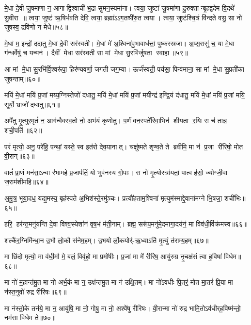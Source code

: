 मे॒धा दे॒वी जु॒षमा॑णा न॒ आगाद्वि॒श्वाची॑ भ॒द्रा सु॑मन॒स्यमा॑ना। त्वया॒ जुष्टा॑ जु॒षमा॑णा दु॒रुक्तान्बृ॒हद्व॑देम वि॒दथे॑ सु॒वीरा॥ त्वया॒ जुष्ट॑ ऋ॒षिर्भ॑वति देवि॒ त्वया॒ ब्रह्मा॑ऽऽग॒तश्री॑रु॒त त्वया। त्वया॒ जुष्ट॑श्चि॒त्रं वि॑न्दते वसु॒ सा नो॑ जुषस्व॒ द्रवि॑णो न मेधे॥५८॥
\anuvakamend


मे॒धां म॒ इन्द्रो॑ ददातु मे॒धां दे॒वी सर॑स्वती। मे॒धां मे॑ अ॒श्विना॑वु॒भावाध॑त्तां॒ पुष्क॑रस्रजा। अ॒प्स॒रासु॑ च॒ या मे॒धा ग॑न्ध॒र्वेषु॑ च॒ यन्मन॑। दैवीं मे॒धा सर॑स्वती॒ सा मां मे॒धा सु॒रभि॑र्जुषता॒ स्वाहा॥५९॥
\anuvakamend


आ मां मे॒धा सु॒रभि॑र्वि॒श्वरू॑पा॒ हिर॑ण्यवर्णा॒ जग॑ती जग॒म्या। ऊर्ज॑स्वती॒ पय॑सा॒ पिन्व॑माना॒ सा मां मे॒धा सु॒प्रती॑का जुषन्ताम्॥६०॥ \anuvakamend

मयि॑ मे॒धां मयि॑ प्र॒जां मय्य॒ग्निस्तेजो॑ दधातु॒ मयि॑ मे॒धां मयि॑ प्र॒जां मयीन्द्र॑ इन्द्रि॒यं द॑धातु॒ मयि॑ मे॒धां मयि॑ प्र॒जां मयि॒ सूर्यो॒ भ्राजो॑ दधातु॥६१॥ \anuvakamend


अपै॑तु मृ॒त्युर॒मृतं॑ न॒ आग॑न्वैवस्व॒तो नो॒ अभ॑यं कृणोतु। प॒र्णं वन॒स्पते॑रिवा॒भिन॑ शीयता र॒यिः स च॑ तान्न॒ शची॒पति॑॥६२॥%
\anuvakamend

 परं॑ मृत्यो॒ अनु॒ परे॑हि॒ पन्थां॒ यस्ते॒ स्व इत॑रो देव॒यानात्। चक्षु॑ष्मते शृण्व॒ते ते ब्रवीमि॒ मा न॑ प्र॒जा री॑रिषो॒ मोत वी॒रान्॥६३॥
 \anuvakamend
 
 वातं॑ प्रा॒णं मन॑सा॒ऽन्वा र॑भामहे प्र॒जाप॑तिं॒ यो भुव॑नस्य गो॒पाः। स नो॑ मृ॒त्योस्त्रा॑यतां॒ पात्वह॑सो॒ ज्योग्जी॒वा ज॒राम॑शीमहि॥६४॥
 \anuvakamend
 
 अ॒मु॒त्र॒ भूया॒दध॒ यद्य॒मस्य॒ बृह॑स्पते अ॒भिश॑स्ते॒रमु॑ञ्चः। प्रत्यौ॑हताम॒श्विना॑ मृ॒त्युम॑स्माद्दे॒वाना॑मग्ने भि॒षजा॒ शची॑भिः॥६५॥
 \anuvakamend
 
 हरि॒ हर॑न्त॒मनु॑यन्ति दे॒वा विश्व॒स्येशा॑नं वृष॒भं म॑ती॒नाम्। ब्रह्म॒ सरू॑प॒मनु॑मे॒दमागा॒दय॑नं॒ मा विव॑धी॒र्विक्र॑मस्व॥६६॥
 \anuvakamend
 
 शल्कै॑र॒ग्निमि॑न्धा॒न उ॒भौ लो॒कौ स॑नेम॒हम्। उ॒भयोर्लो॒कयोर्॑-ऋ॒ध्वाऽति॑ मृ॒त्युं त॑राम्य॒हम्॥६७॥
\anuvakamend
 
मा छि॑दो मृत्यो॒ मा व॑धी॒र्मा मे॒ बलं॒ विवृ॑हो॒ मा प्रमो॑षीः। प्र॒जां मा मे॑ रीरिष॒ आयु॑रुग्र नृ॒चक्ष॑सं त्वा ह॒विषा॑ विधेम॥६८॥
\anuvakamend
 
मा नो॑ म॒हान्त॑मु॒त मा नो॑ अर्भ॒कं मा न॒ उक्ष॑न्तमु॒त मा न॑ उक्षि॒तम्। मा नो॑ऽवधीः पि॒तरं॒ मोत मा॒तरं॑ प्रि॒या मा न॑स्त॒नुवो॑ रुद्र रीरिषः॥६९॥
\anuvakamend

मा न॑स्तो॒के तन॑ये॒ मा न॒ आयु॑षि॒ मा नो॒ गोषु॒ मा नो॒ अश्वे॑षु रीरिषः। वी॒रान्मा नो॑ रुद्र भामि॒तोऽव॑धीर्‌ह॒विष्म॑न्तो॒ नम॑सा विधेम ते॥७०॥
\anuvakamend 

